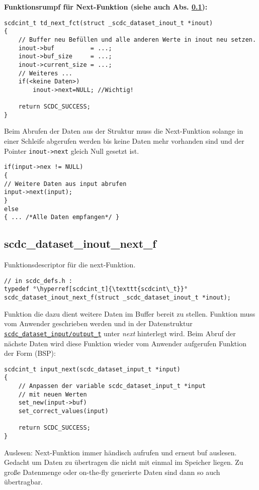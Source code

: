 \vspace{2ex}
\pagebreak
\textbf{Funktionsrumpf für Next-Funktion (siehe auch Abs. \ref{scdc_dataset_inout_next_f}):}
\begin{lstlisting}[escapechar={~}, label={l:td_next_fct}]
scdcint_t td_next_fct(struct _scdc_dataset_inout_t *inout)
{
	// Buffer neu Befüllen und alle anderen Werte in inout neu setzen.
	inout->buf          = ...;
	inout->buf_size     = ...;
	inout->current_size = ...;
	// Weiteres ...
	if(<keine Daten>)
		inout->next=NULL; //Wichtig!
		
	return SCDC_SUCCESS;
}
\end{lstlisting}

\begin{minipage}{\textwidth}
Beim Abrufen der Daten aus der Struktur muss die Next-Funktion solange in einer Schleife abgerufen werden bis keine Daten mehr vorhanden sind und 
der Pointer \texttt{inout->next} gleich Null gesetzt ist.
\begin{lstlisting}[escapechar={~}]
if(input->nex != NULL)
{
// Weitere Daten aus input abrufen
input->next(input);
}
else
{ ... /*Alle Daten empfangen*/ }
\end{lstlisting}
\end{minipage}


\subsection{scdc\_dataset\_inout\_next\_f}\label{scdc_dataset_inout_next_f}
Funktionsdescriptor für die next-Funktion.
\begin{lstlisting}[escapechar={°}, label={l:scdc_dataset_inout_next_f}]
// in scdc_defs.h :
typedef °\hyperref[scdcint_t]{\texttt{scdcint\_t}}° scdc_dataset_inout_next_f(struct _scdc_dataset_inout_t *inout);
\end{lstlisting}
Funktion die dazu dient weitere Daten im Buffer bereit zu stellen. Funktion muss vom Anwender geschrieben werden und in der Datenstruktur
\hyperref[scdc_dataset_input_t]{\texttt{scdc\_dataset\_input/output\_t}} unter \textit{next} hinterlegt wird.
Beim Abruf der nächste Daten wird diese Funktion wieder vom Anwender aufgerufen
Funktion der Form (BSP):
\begin{lstlisting}[escapechar={°}]
scdcint_t input_next(scdc_dataset_input_t *input)
{
	// Anpassen der variable scdc_dataset_input_t *input
	// mit neuen Werten
	set_new(input->buf)
	set_correct_values(input)
	
	return SCDC_SUCCESS;
}
\end{lstlisting}

Auslesen: Next-Funktion immer händisch aufrufen und erneut buf auslesen.
Gedacht um Daten zu übertragen die nicht mit einmal im Speicher liegen. 
Zu große Datenmenge oder on-the-fly generierte Daten sind dann so auch übertragbar.



